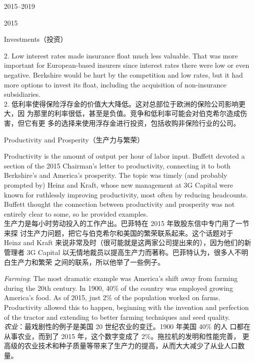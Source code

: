 \begin{chapter}{2015--2019}
\begin{section}{2015}
\begin{subsection}{Investments（投资）}
\begin{verseparallel}
  {
    2. Low interest rates made insurance float much less valuable. That was more
    important for European-based insurers since interest rates there were low or
    even negative. Berkshire would be hurt by the competition and low rates, but
    it had more options to invest its float, including the acquisition of
    non-insurance subsidiaries. \\
  }
  {
    2. 低利率使得保险浮存金的价值大大降低。这对总部位于欧洲的保险公司影响更大，因
    为那里的利率很低，甚至是负值。竞争和低利率可能会对伯克希尔造成伤害，但它有更
    多的选择来使用浮存金进行投资，包括收购非保险行业的公司。
  }
\end{verseparallel}

\end{subsection}

\begin{subsection}{Productivity and Prosperity（生产力与繁荣）}
\begin{verseparallel}
  {
    Productivity is the amount of output per hour of labor input. Buffett
    devoted a section of the 2015 Chairman's letter to productivity, connecting
    it to both Berkshire's and America's prosperity. The topic was timely (and
    probably prompted by) Heinz and Kraft, whose new management at 3G Capital
    were known for ruthlessly improving productivity, most often by reducing
    headcounts. Buffett thought the connection between productivity and
    prosperity was not entirely clear to some, so he provided examples. \\
  }
  {
    生产力是每小时劳动投入的工作产出。巴菲特在 2015 年致股东信中专门用了一节来探
    讨生产力问题，把它与伯克希尔和美国的繁荣联系起来。这个话题对于 Heinz and
    Kraft 来说非常及时（很可能就是这两家公司提出来的），因为他们的新管理者 3G
    Capital 以无情地裁员以提高生产力而著称。巴菲特认为，很多人不明白生产力和繁荣
    之间的联系，所以他举了一些例子。
  }
\end{verseparallel}

{\color{green}{此处应为列表项 \\}}

\begin{verseparallel}
  {
    \textit{Farming}: The most dramatic example was America's shift away
    from farming during the 20th century. In 1900, 40\% of the country
    was employed growing America's food. As of 2015, just 2\% of the
    population worked on farms. Productivity allowed this to happen,
    beginning with the invention and perfection of the tractor and
    extending to better farming techniques and seed quality. \\
  }
  {
    \textit{农业}：最戏剧性的例子是美国 20 世纪农业的变迁。1900 年美国 40\% 的人
    口都在从事农业，而到了 2015 年，这个数字变成了 2\%。拖拉机的发明和性能完善，
    更高级的农业技术和种子质量等带来了生产力的提高，从而大大减少了从业人口数量。
  }
\end{verseparallel}


\end{subsection}
\end{section}
\end{chapter}
